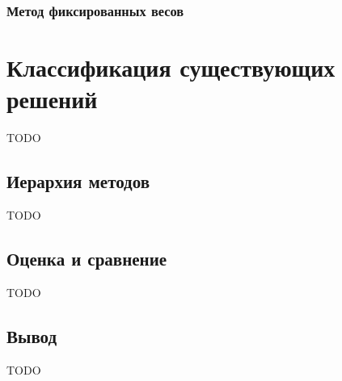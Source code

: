 \subsubsection{Метод фиксированных весов}

\section{Классификация существующих решений}

TODO

\subsection{Иерархия методов}

TODO

\subsection{Оценка и сравнение}

TODO

\subsection{Вывод}

TODO
